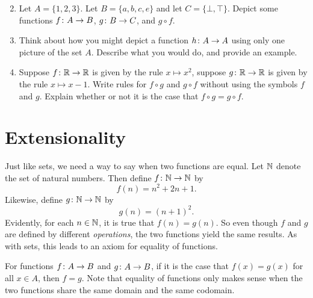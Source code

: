 \begin{exercises}
\begin{enumerate}
\begin{multicols}{2}
\begin{enumerate}
	  \end{enumerate}
	  \end{multicols}
		\item Let $A = \{1,2,3\}$. Let $B=\{a,b,c,e\}$ and let $C = \{\bot,\top\}$.
		Depict some functions ${f}\colon{A}\to{B}$, ${g}\colon{B}\to{C}$, and $g\circ f$. 
		\item Think about how you might depict a function ${h}\colon{A}\to{A}$ using only one picture of the set $A$.
		Describe what you would do, and provide an example.
		\item Suppose ${f}\colon{\mathbb R}\to{\mathbb R}$ is given by the rule $x\mapsto x^2$, suppose ${g}\colon{\mathbb R}\to{\mathbb R}$ is given
		by the rule $x\mapsto x-1$. Write rules for $f\circ g$ and $g\circ f$ without using the symbols $f$ and $g$. Explain whether or not it is the case that $f\circ g = g\circ f$.
	\end{enumerate}
\end{exercises}

\section{Extensionality}

Just like sets, we need a way to say when two functions are equal.
Let $\mathbb N$ denote the set of natural numbers. 
Then define ${f}\colon{\mathbb N}\to{\mathbb N}$ by
\[f(n) = n^2 +  2n + 1.\]
Likewise, define ${g}\colon{\mathbb N}\to{\mathbb N}$ by
\[g(n) = (n+1)^2.\]
Evidently, for each $n\in\mathbb N$, it is true that $f(n) = g(n)$.
So even though $f$ and $g$ are defined by different \emph{operations}, the two functions yield the same results.
As with sets, this leads to an axiom for equality of functions.

\begin{axiom}
	For functions ${f}\colon{A}\to{B}$ and ${g}\colon{A}\to{B}$, if it is the case that $f(x)=g(x)$ for all $x\in A$, then $f=g$.
	Note that equality of functions only makes sense when the two functions share the same domain and the same codomain.
\end{axiom}

